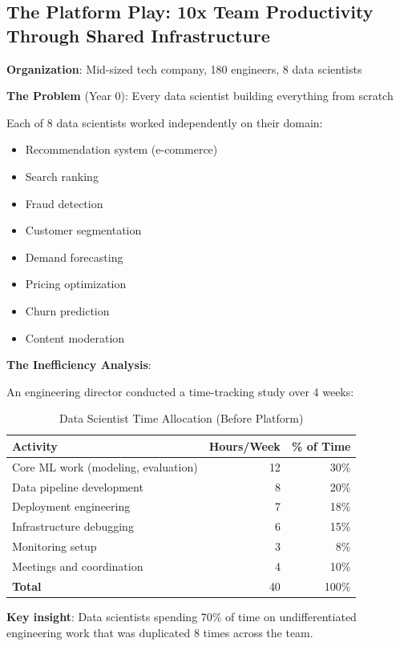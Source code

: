 \subsection{The Platform Play: 10x Team Productivity Through Shared Infrastructure}

\textbf{Organization}: Mid-sized tech company, 180 engineers, 8 data scientists

\textbf{The Problem} (Year 0): Every data scientist building everything from scratch

Each of 8 data scientists worked independently on their domain:
\begin{itemize}
    \item Recommendation system (e-commerce)
    \item Search ranking
    \item Fraud detection
    \item Customer segmentation
    \item Demand forecasting
    \item Pricing optimization
    \item Churn prediction
    \item Content moderation
\end{itemize}

\textbf{The Inefficiency Analysis}:

An engineering director conducted a time-tracking study over 4 weeks:

\begin{table}[h]
\centering
\caption{Data Scientist Time Allocation (Before Platform)}
\begin{tabular}{lrr}
\toprule
\textbf{Activity} & \textbf{Hours/Week} & \textbf{\% of Time} \\
\midrule
Core ML work (modeling, evaluation) & 12 & 30\% \\
Data pipeline development & 8 & 20\% \\
Deployment engineering & 7 & 18\% \\
Infrastructure debugging & 6 & 15\% \\
Monitoring setup & 3 & 8\% \\
Meetings and coordination & 4 & 10\% \\
\midrule
\textbf{Total} & 40 & 100\% \\
\bottomrule
\end{tabular}
\end{table}

\textbf{Key insight}: Data scientists spending 70\% of time on undifferentiated engineering work that was duplicated 8 times across the team.

